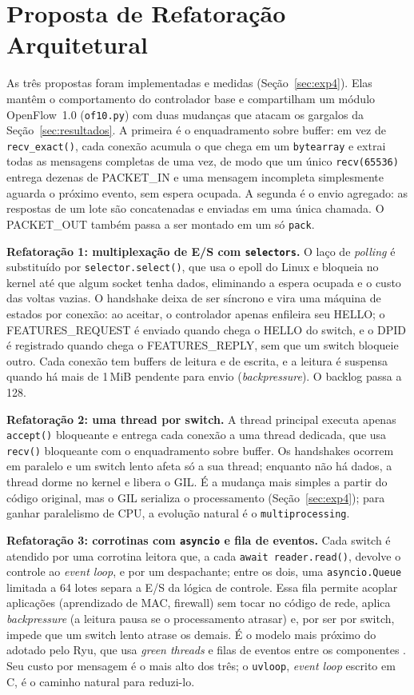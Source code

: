\documentclass[12pt]{article}
\begin{document}
\section{Proposta de Refatoração Arquitetural}
\label{sec:refatoracao}
As três propostas foram implementadas e medidas
(Seção~\ref{sec:exp4}). Elas mantêm o comportamento do controlador base e
compartilham um módulo OpenFlow~1.0 (\texttt{of10.py}) com duas mudanças que atacam os
gargalos da Seção~\ref{sec:resultados}. A primeira é o enquadramento sobre buffer: em
vez de \texttt{recv\_exact()}, cada conexão acumula o que chega em um
\texttt{bytearray} e extrai todas as mensagens completas de uma vez, de modo que um
único \texttt{recv(65536)} entrega dezenas de PACKET\_IN e uma mensagem incompleta
simplesmente aguarda o próximo evento, sem espera ocupada. A segunda é o envio
agregado: as respostas de um lote são concatenadas e enviadas em uma única chamada.
O PACKET\_OUT também passa a ser montado em um só \texttt{pack}.


\textbf{Refatoração 1: multiplexação de E/S com \texttt{selectors}.} O laço de
\textit{polling} é substituído por \texttt{selector.select()}, que usa o epoll do Linux
e bloqueia no kernel até que algum socket tenha dados, eliminando a espera ocupada e o
custo das voltas vazias. O handshake deixa de ser síncrono e vira uma máquina de estados
por conexão: ao aceitar, o controlador apenas enfileira seu HELLO; o FEATURES\_REQUEST
é enviado quando chega o HELLO do switch, e o DPID é registrado quando chega o
FEATURES\_REPLY, sem que um switch bloqueie outro. Cada conexão tem buffers de leitura e
de escrita, e a leitura é suspensa quando há mais de 1\,MiB pendente para envio
(\textit{backpressure}). O backlog passa a 128.

\textbf{Refatoração 2: uma thread por switch.} A thread principal executa apenas
\texttt{accept()} bloqueante e entrega cada conexão a uma thread dedicada, que usa
\texttt{recv()} bloqueante com o enquadramento sobre buffer. Os handshakes ocorrem em
paralelo e um switch lento afeta só a sua thread; enquanto não há dados, a thread dorme
no kernel e libera o GIL. É a mudança mais simples a partir do código original, mas o
GIL serializa o processamento (Seção~\ref{sec:exp4}); para ganhar paralelismo de CPU, a
evolução natural é o \texttt{multiprocessing}.

\textbf{Refatoração 3: corrotinas com \texttt{asyncio} e fila de eventos.} Cada switch é
atendido por uma corrotina leitora que, a cada \texttt{await reader.read()}, devolve o
controle ao \textit{event loop}, e por um despachante; entre os dois, uma
\texttt{asyncio.Queue} limitada a 64 lotes separa a E/S da lógica de controle. Essa fila
permite acoplar aplicações (aprendizado de MAC, firewall) sem tocar no código de rede,
aplica \textit{backpressure} (a leitura pausa se o processamento atrasar) e, por ser por
switch, impede que um switch lento atrase os demais. É o modelo mais próximo do adotado
pelo Ryu, que usa \textit{green threads} e filas de eventos entre os componentes
\cite{ryu}. Seu custo por mensagem é o mais alto dos três; o \texttt{uvloop}, \textit{event loop}
escrito em C, é o caminho natural para reduzi-lo.
\end{document}
